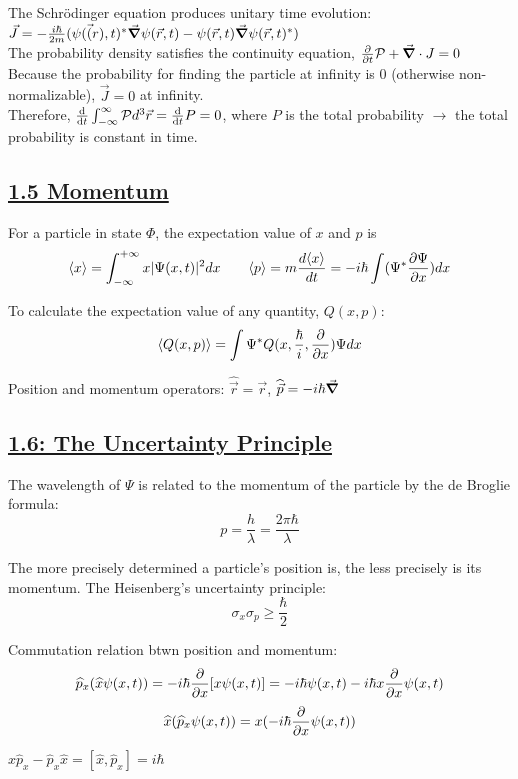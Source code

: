 The Schr\"odinger equation produces unitary time evolution: \\
$\vec{J} = - \frac{i \hbar}{2m} (\psi(\vec(r), t)^* \vec{\grad} \psi(\vec{r}, t) - \psi(\vec{r}, t) \vec{\grad} \psi(\vec{r}, t)^*)$ \\
The probability density satisfies the continuity equation, $\pdv{}{t} \mathcal{P} + \vec{\grad} \cdot J = 0$ \\
Because the probability for finding the particle at infinity is 0 (otherwise non-normalizable), $\vec{J} = 0$ at infinity. \\
Therefore, $\dv{}{t} \int_{-\infty}^{\infty} \mathcal{P} d^3 \vec{r} = \dv{}{t} P = 0$, where $P$ is the total probability $\rightarrow$
the total probability is constant in time.

\subsection{\underline{1.5 Momentum}}
For a particle in state $\Phi$, the expectation value of $x$ and $p$ is
    $$\langle x \rangle = \int_{-\infty}^{+\infty} x |\Psi(x, t)|^2 dx \qquad \langle p \rangle = m \frac{d \langle x \rangle}{dt} = -i \hbar \int (\Psi^* \pdv{\Psi}{x}) dx$$

To calculate the expectation value of any quantity, $Q(x, p)$:
$$\langle Q(x, p) \rangle = \int \Psi^* Q(x, \frac{\hbar}{i}, \pdv{}{x}) \Psi dx$$

Position and momentum operators: $\widehat{\vec{r}} = \vec{r}$, $\widehat{\vec{p}} = -i \hbar \vec{\grad}$

\subsection{\underline{1.6: The Uncertainty Principle}}
The wavelength of $\Psi$ is related to the momentum of the particle by the de Broglie formula:
    $$p = \frac{h}{\lambda} = \frac{2 \pi \hbar}{\lambda}$$

The more precisely determined a particle's position is, the less precisely is its momentum. The Heisenberg's uncertainty principle:
    $$\sigma_x \sigma_p \geq \frac{\hbar}{2}$$

Commutation relation btwn position and momentum:
$$\widehat{p}_x (\widehat{x} \psi(x, t)) = -i \hbar \pdv{}{x} [x \psi(x, t)] = -i \hbar \psi(x, t) - i \hbar x \pdv{}{x} \psi(x, t)$$
    $$\widehat{x} (\widehat{p}_x \psi(x, t)) = x (-i \hbar \pdv{}{x} \psi(x, t))$$

    $\widehat{x} \widehat{p}_x - \widehat{p}_x \widehat{x} = [\widehat{x}, \widehat{p}_x] = i \hbar$

